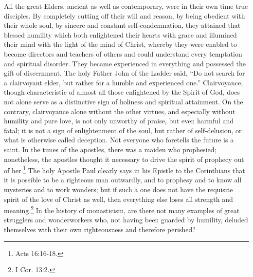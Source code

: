 All the great Elders, ancient as well as contemporary, were in their own time true disciples. By completely cutting off their will and reason, by being obedient with their whole soul, by sincere and constant self-condemnation, they attained that blessed humility which both enlightened their hearts with grace and illumined their mind with the light of the mind of Christ, whereby they were enabled to become directors and teachers of others and could understand every temptation and spiritual disorder. They became experienced in everything and possessed the gift of discernment. The holy Father John of the Ladder said, ``Do not search for a clairvoyant elder, but rather for a humble and experienced one.'' Clairvoyance, though characteristic of almost all those enlightened by the Spirit of God, does not alone serve as a distinctive sign of holiness and spiritual attainment. On the contrary, clairvoyance alone without the other virtues, and especially without humility and pure love, is not only unworthy of praise, but even harmful and fatal; it is not a sign of enlightenment of the soul, but rather of self-delusion, or what is otherwise called deception. Not everyone who foretells the future is a saint. In the times of the apostles, there was a maiden who prophesied; nonetheless, the apostles thought it necessary to drive the spirit of prophecy out of her.\footnote{Acts 16:16-18.} The holy Apostle Paul clearly says in his Epistle to the Corinthians that it is possible to be a righteous man outwardly, and to prophesy and to know all mysteries and to work wonders; but if such a one does not have the requisite spirit of the love of Christ as well, then everything else loses all strength and meaning.\footnote{I Cor. 13:2.} In the history of monasticism, are there not many examples of great strugglers and wonderworkers who, not having been guarded by humility, deluded themselves with their own righteousness and therefore perished?

